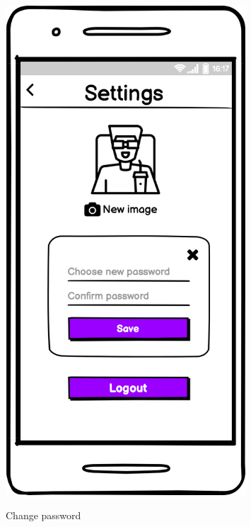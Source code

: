 \documentclass[12pt, a4paper]{article}
\numberwithin{figure}{section}
\begin{document}
\begin{center}
\begin{minipage}{0.3\textwidth}
\begin{figure}[H]
			\includegraphics[width=0.8\textwidth]{images/mockups/User setting password.png}\\
			\caption{Change password}
		\end{figure}
	\end{minipage}
\end{center}
\end{document}
